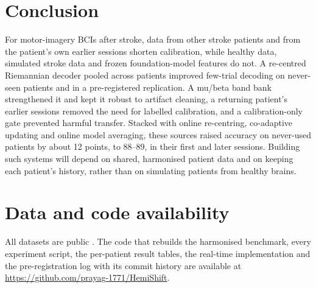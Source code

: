 \section{Conclusion}

For motor-imagery BCIs after stroke, data from other stroke patients and from the patient's own earlier sessions shorten calibration, while healthy data, simulated stroke data and frozen foundation-model features do not. A re-centred Riemannian decoder pooled across patients improved few-trial decoding on never-seen patients and in a pre-registered replication. A mu/beta band bank strengthened it and kept it robust to artifact cleaning, a returning patient's earlier sessions removed the need for labelled calibration, and a calibration-only gate prevented harmful transfer. Stacked with online re-centring, co-adaptive updating and online model averaging, these sources raised accuracy on never-used patients by about 12 points, to 88--89\pct{}, in their first and later sessions. Building such systems will depend on shared, harmonised patient data and on keeping each patient's history, rather than on simulating patients from healthy brains.

\section*{Data and code availability}
All datasets are public \citep{liu2024,wang2026,liu2025gait,schalk2004,goldberger2000}. The code that rebuilds the harmonised benchmark, every experiment script, the per-patient result tables, the real-time implementation and the pre-registration log with its commit history are available at \url{https://github.com/prayag-1771/HemiShift}.
